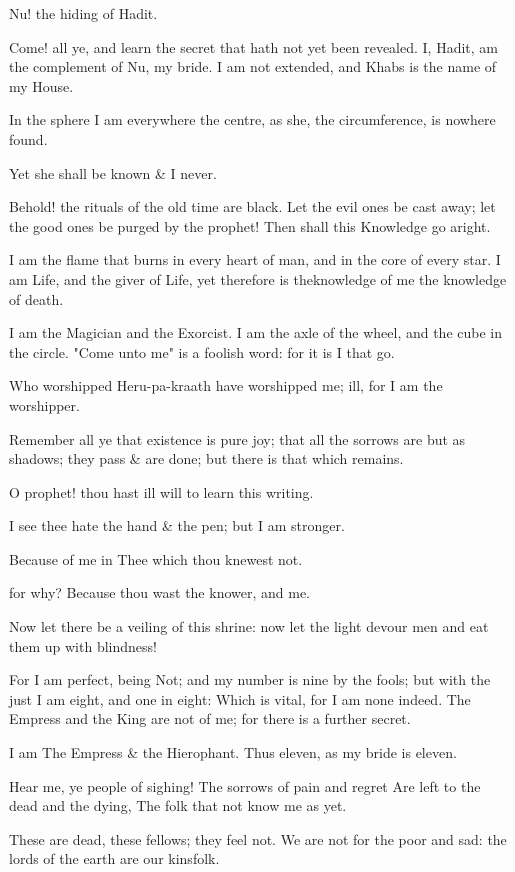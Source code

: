 Nu! the hiding of Hadit.

Come! all ye, and learn the secret that hath not yet been revealed. I, Hadit, am the complement of Nu, my bride. I am not extended, and Khabs is the name of my House.

In the sphere I am everywhere the centre, as she, the circumference, is nowhere found.

Yet she shall be known & I never.

Behold! the rituals of the old time are black. Let the evil ones be cast away; let the good ones be purged by the prophet! Then shall this Knowledge go aright.

I am the flame that burns in every heart of man, and in the core of every star. I am Life, and the giver of Life, yet therefore is theknowledge of me the knowledge of death.

I am the Magician and the Exorcist. I am the axle of the wheel, and the cube in the circle. "Come unto me" is a foolish word: for it is I that go.

Who worshipped Heru-pa-kraath have worshipped me; ill, for I am the worshipper.

Remember all ye that existence is pure joy; that all the sorrows are but as shadows; they pass & are done; but there is that which remains.

O prophet! thou hast ill will to learn this writing.

I see thee hate the hand & the pen; but I am stronger.

Because of me in Thee which thou knewest not.

for why? Because thou wast the knower, and me.

Now let there be a veiling of this shrine: now let the light devour men and eat them up with blindness!

For I am perfect, being Not; and my number is nine by the fools; but with the just I am eight, and one in eight: Which is vital, for I am none indeed. The Empress and the King are not of me; for there is a further secret.

I am The Empress & the Hierophant. Thus eleven, as my bride is eleven.

Hear me, ye people of sighing!
The sorrows of pain and regret
Are left to the dead and the dying,
The folk that not know me as yet.

These are dead, these fellows; they feel not. We are not for the poor and sad: the lords of the earth are our kinsfolk.

